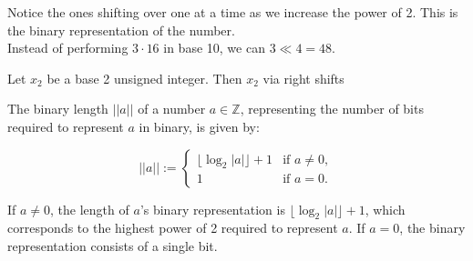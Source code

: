 \noindent
Notice the ones shifting over one at a time as we increase the power of 2. This is the binary representation of the number.\\

\noindent
Instead of performing $3 \cdot 16$ in base 10, we can $3 \ll 4=48$. 

\begin{theo}

    Let $x_2$ be a base 2 unsigned integer. Then $x_2$ via right shifts 

    
\newpage 
\end{theo}
\begin{Func}
    
    The binary length $||a||$ of a number $a \in \mathbb{Z}$, representing the number of bits required to represent $a$ in binary, is given by:
    
    \[
    ||a|| := 
    \begin{cases} 
    \lfloor \log_2 |a| \rfloor + 1 & \text{if } a \neq 0, \\
    1 & \text{if } a = 0.
    \end{cases}
    \]
    
    \noindent
    If $a \neq 0$, the length of $a$'s binary representation is $\lfloor \log_2 |a| \rfloor + 1$, which corresponds to the highest power of 2 required to represent $a$. If $a = 0$, the binary representation consists of a single bit.
\end{Func}



